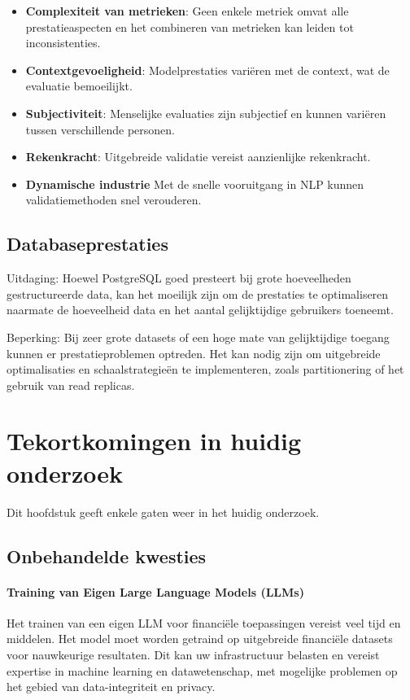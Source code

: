 \begin{itemize}
    \item \textbf{Complexiteit van metrieken}: Geen enkele metriek omvat alle prestatieaspecten en het combineren van metrieken kan leiden tot inconsistenties.
    \item \textbf{Contextgevoeligheid}: Modelprestaties variëren met de context, wat de evaluatie bemoeilijkt.
    \item \textbf{Subjectiviteit}: Menselijke evaluaties zijn subjectief en kunnen variëren tussen verschillende personen.
    \item \textbf{Rekenkracht}: Uitgebreide validatie vereist aanzienlijke rekenkracht.
    \item  \textbf{Dynamische industrie} Met de snelle vooruitgang in NLP kunnen validatiemethoden snel verouderen.
\end{itemize}



\subsection{Databaseprestaties}
Uitdaging: Hoewel PostgreSQL goed presteert bij grote hoeveelheden gestructureerde data, kan het moeilijk zijn om de prestaties te optimaliseren naarmate de hoeveelheid data en het aantal gelijktijdige gebruikers toeneemt.

Beperking: Bij zeer grote datasets of een hoge mate van gelijktijdige toegang kunnen er prestatieproblemen optreden. Het kan nodig zijn om uitgebreide optimalisaties en schaalstrategieën te implementeren, zoals partitionering of het gebruik van read replicas.
\section{Tekortkomingen in huidig onderzoek}
Dit hoofdstuk geeft enkele gaten weer in het huidig onderzoek.
\subsection{Onbehandelde kwesties}
\paragraph{Training van Eigen Large Language Models (LLMs)}
Het trainen van een eigen LLM voor financiële toepassingen vereist veel tijd en middelen. Het model moet worden getraind op uitgebreide financiële datasets voor nauwkeurige resultaten. Dit kan uw infrastructuur belasten en vereist expertise in machine learning en datawetenschap, met mogelijke problemen op het gebied van data-integriteit en privacy.

